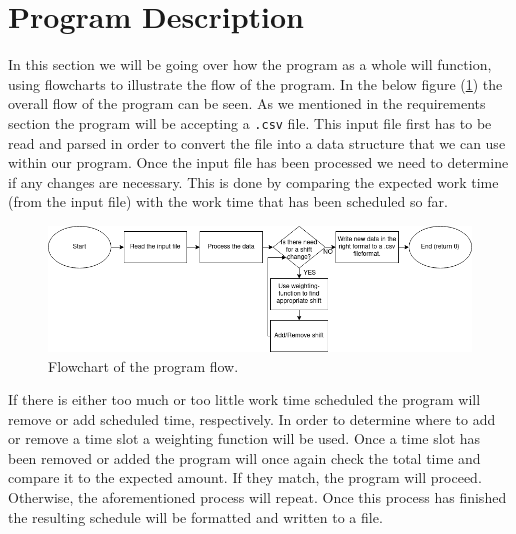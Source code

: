 \section{Program Description}
In this section we will be going over how the program as a whole will function, using flowcharts to illustrate the flow of the program. In the below figure (\ref{fig:Main_Flowchart}) the overall flow of the program can be seen. As we mentioned in the requirements section the program will be accepting a \verb|.csv| file. This input file first has to be read and parsed in order to convert the file into a data structure that we can use within our program. Once the input file has been processed we need to determine if any changes are necessary. This is done by comparing the expected work time (from the input file) with the work time that has been scheduled so far.

\fi

\begin{figure}[ht!]
    \centering
    \includegraphics[width=\textwidth]{media/Flowcharts/General flowchart.png}
    \caption{Flowchart of the program flow.}
    \label{fig:Main_Flowchart}
\end{figure}

If there is either too much or too little work time scheduled the program will remove or add scheduled time, respectively. In order to determine where to add or remove a time slot a weighting function will be used. Once a time slot has been removed or added the program will once again check the total time and compare it to the expected amount. If they match, the program will proceed. Otherwise, the aforementioned process will repeat. Once this process has finished the resulting schedule will be formatted and written to a file.

